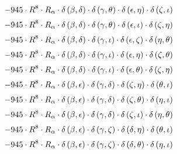 \begin{subequations}
\begin{gather}
 \\[0.2em] \notag 		 - 945 \cdot R^{8} \cdot R_{\alpha{}} \cdot \delta{}\left(\beta{}, \delta{}\right) \cdot \delta{}\left(\gamma{}, \theta{}\right) \cdot \delta{}\left(\epsilon{}, \eta{}\right) \cdot \delta{}\left(\zeta{}, \iota{}\right) 
 \\[0.2em] \notag 		 - 945 \cdot R^{8} \cdot R_{\alpha{}} \cdot \delta{}\left(\beta{}, \delta{}\right) \cdot \delta{}\left(\gamma{}, \theta{}\right) \cdot \delta{}\left(\epsilon{}, \iota{}\right) \cdot \delta{}\left(\zeta{}, \eta{}\right) 
 \\[0.2em] \notag 		 - 945 \cdot R^{8} \cdot R_{\alpha{}} \cdot \delta{}\left(\beta{}, \delta{}\right) \cdot \delta{}\left(\gamma{}, \iota{}\right) \cdot \delta{}\left(\epsilon{}, \zeta{}\right) \cdot \delta{}\left(\eta{}, \theta{}\right) 
 \\[0.2em] \notag 		 - 945 \cdot R^{8} \cdot R_{\alpha{}} \cdot \delta{}\left(\beta{}, \delta{}\right) \cdot \delta{}\left(\gamma{}, \iota{}\right) \cdot \delta{}\left(\epsilon{}, \eta{}\right) \cdot \delta{}\left(\zeta{}, \theta{}\right) 
 \\[0.2em] \notag 		 - 945 \cdot R^{8} \cdot R_{\alpha{}} \cdot \delta{}\left(\beta{}, \delta{}\right) \cdot \delta{}\left(\gamma{}, \iota{}\right) \cdot \delta{}\left(\epsilon{}, \theta{}\right) \cdot \delta{}\left(\zeta{}, \eta{}\right) 
 \\[0.2em] \notag 		 - 945 \cdot R^{8} \cdot R_{\alpha{}} \cdot \delta{}\left(\beta{}, \epsilon{}\right) \cdot \delta{}\left(\gamma{}, \delta{}\right) \cdot \delta{}\left(\zeta{}, \eta{}\right) \cdot \delta{}\left(\theta{}, \iota{}\right) 
 \\[0.2em] \notag 		 - 945 \cdot R^{8} \cdot R_{\alpha{}} \cdot \delta{}\left(\beta{}, \epsilon{}\right) \cdot \delta{}\left(\gamma{}, \delta{}\right) \cdot \delta{}\left(\zeta{}, \theta{}\right) \cdot \delta{}\left(\eta{}, \iota{}\right) 
 \\[0.2em] \notag 		 - 945 \cdot R^{8} \cdot R_{\alpha{}} \cdot \delta{}\left(\beta{}, \epsilon{}\right) \cdot \delta{}\left(\gamma{}, \delta{}\right) \cdot \delta{}\left(\zeta{}, \iota{}\right) \cdot \delta{}\left(\eta{}, \theta{}\right) 
 \\[0.2em] \notag 		 - 945 \cdot R^{8} \cdot R_{\alpha{}} \cdot \delta{}\left(\beta{}, \epsilon{}\right) \cdot \delta{}\left(\gamma{}, \zeta{}\right) \cdot \delta{}\left(\delta{}, \eta{}\right) \cdot \delta{}\left(\theta{}, \iota{}\right) 
 \\[0.2em] \notag 		 - 945 \cdot R^{8} \cdot R_{\alpha{}} \cdot \delta{}\left(\beta{}, \epsilon{}\right) \cdot \delta{}\left(\gamma{}, \zeta{}\right) \cdot \delta{}\left(\delta{}, \theta{}\right) \cdot \delta{}\left(\eta{}, \iota{}\right) 

\end{gather}
\end{subequations}
